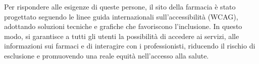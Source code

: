 Per rispondere alle esigenze di queste persone, il sito della farmacia è stato progettato seguendo le linee guida internazionali sull’accessibilità (WCAG), adottando soluzioni tecniche e grafiche che favoriscono l’inclusione. In questo modo, si garantisce a tutti gli utenti la possibilità di accedere ai servizi, alle informazioni sui farmaci e di interagire con i professionisti, riducendo il rischio di esclusione e promuovendo una reale equità nell’accesso alla salute.